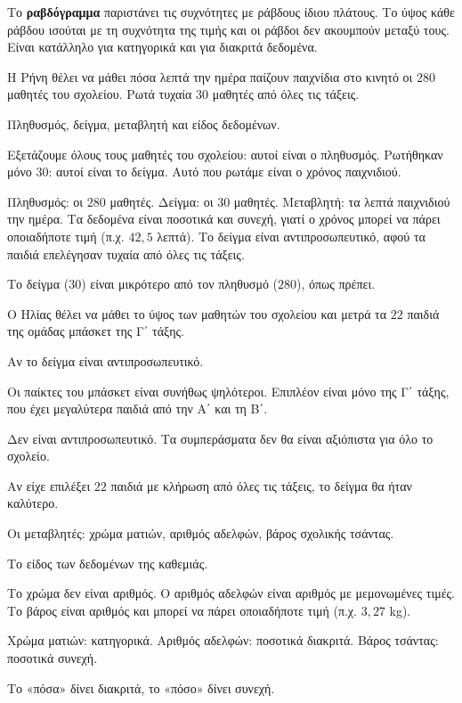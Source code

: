 Το \textbf{ραβδόγραμμα} παριστάνει τις συχνότητες με ράβδους ίδιου πλάτους. Το ύψος κάθε ράβδου ισούται με τη συχνότητα της τιμής και οι ράβδοι δεν ακουμπούν μεταξύ τους. Είναι κατάλληλο για κατηγορικά και για διακριτά δεδομένα.


\tixero Η Ρήνη θέλει να μάθει πόσα λεπτά την ημέρα παίζουν παιχνίδια στο κινητό οι $280$ μαθητές του σχολείου. Ρωτά τυχαία $30$ μαθητές από όλες τις τάξεις.\par
\tithelo Πληθυσμός, δείγμα, μεταβλητή και είδος δεδομένων.\par
\possindeo Εξετάζουμε όλους τους μαθητές του σχολείου: αυτοί είναι ο πληθυσμός. Ρωτήθηκαν μόνο $30$: αυτοί είναι το δείγμα. Αυτό που ρωτάμε είναι ο χρόνος παιχνιδιού.\par
\apantisi Πληθυσμός: οι $280$ μαθητές. Δείγμα: οι $30$ μαθητές. Μεταβλητή: τα λεπτά παιχνιδιού την ημέρα. Τα δεδομένα είναι ποσοτικά και συνεχή, γιατί ο χρόνος μπορεί να πάρει οποιαδήποτε τιμή (π.χ. $42{,}5$ λεπτά). Το δείγμα είναι αντιπροσωπευτικό, αφού τα παιδιά επελέγησαν τυχαία από όλες τις τάξεις.\par
\elegxos Το δείγμα ($30$) είναι μικρότερο από τον πληθυσμό ($280$), όπως πρέπει.

\tixero Ο Ηλίας θέλει να μάθει το ύψος των μαθητών του σχολείου και μετρά τα $22$ παιδιά της ομάδας μπάσκετ της Γ΄ τάξης.\par
\tithelo Αν το δείγμα είναι αντιπροσωπευτικό.\par
\possindeo Οι παίκτες του μπάσκετ είναι συνήθως ψηλότεροι. Επιπλέον είναι μόνο της Γ΄ τάξης, που έχει μεγαλύτερα παιδιά από την Α΄ και τη Β΄.\par
\apantisi Δεν είναι αντιπροσωπευτικό. Τα συμπεράσματα δεν θα είναι αξιόπιστα για όλο το σχολείο.\par
\elegxos Αν είχε επιλέξει $22$ παιδιά με κλήρωση από όλες τις τάξεις, το δείγμα θα ήταν καλύτερο.

\tixero Οι μεταβλητές: χρώμα ματιών, αριθμός αδελφών, βάρος σχολικής τσάντας.\par
\tithelo Το είδος των δεδομένων της καθεμιάς.\par
\possindeo Το χρώμα δεν είναι αριθμός. Ο αριθμός αδελφών είναι αριθμός με μεμονωμένες τιμές. Το βάρος είναι αριθμός και μπορεί να πάρει οποιαδήποτε τιμή (π.χ. $3{,}27$ kg).\par
\apantisi Χρώμα ματιών: κατηγορικά. Αριθμός αδελφών: ποσοτικά διακριτά. Βάρος τσάντας: ποσοτικά συνεχή.\par
\elegxos Το «πόσα» δίνει διακριτά, το «πόσο» δίνει συνεχή.

